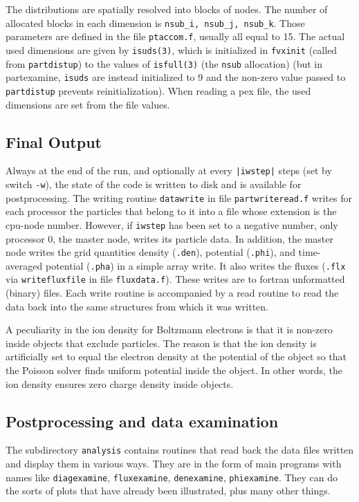 \documentclass[12pt]{article}
\begin{document}
The distributions are spatially resolved into blocks of nodes. The
number of allocated blocks in each dimension is
\verb!nsub_i, nsub_j, nsub_k!.  Those parameters are defined in the
file \verb!ptaccom.f!, usually all equal to 15. The actual used
dimensions are given by \verb!isuds(3)!, which is initialized in
\verb!fvxinit! (called from \verb!partdistup!) to the values of
\verb!isfull(3)! (the \verb!nsub! allocation) (but in partexamine,
\verb!isuds! are instead initialized to 9 and the non-zero value
passed to \verb!partdistup! prevents reinitialization). When reading a
pex file, the used dimensions are set from the file values.



\subsection{Final Output}

Always at the end of the run, and optionally at every \verb!|iwstep|!
steps (set by switch \verb!-w!), the state of the code is written to
disk and is available for postprocessing. The writing routine
\verb!datawrite! in file \verb!partwriteread.f! writes for each
processor the particles that belong to it into a file whose extension
is the cpu-node number. However, if \verb!iwstep! has been set
to a negative number, only processor 0, the master
node, writes its particle data. In addition, the master node writes
the grid quantities density (\verb!.den!), potential (\verb!.phi!),
and time-averaged potential (\verb!.pha!) in a simple array write. It
also writes the fluxes (\verb!.flx! via \verb!writefluxfile! in file
\verb!fluxdata.f!). These writes are to fortran unformatted (binary)
files. Each write routine is accompanied by a read routine to read the
data back into the same structures from which it was written.

A peculiarity in the ion density for Boltzmann electrons is that it is
non-zero inside objects that exclude particles. The reason is that the
ion density is artificially set to equal the electron density at the 
potential of the object so that the Poisson solver finds uniform
potential inside the object. In other words, the ion density ensures
zero charge density inside objects.

\subsection{Postprocessing and data examination}

The subdirectory \verb!analysis! contains routines that read back the
data files written and display them in various ways. They are in the
form of main programs with names like \verb!diagexamine!,
\verb!fluxexamine!, \verb!denexamine!, \verb!phiexamine!. 
They can do the sorts of plots that have already been illustrated,
plus many other things.
\end{document}
